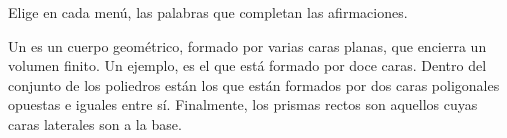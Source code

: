 \question Elige en cada menú, las palabras que completan las afirmaciones.
\begin{center}
     \quad {} \quad {} \quad
     \quad {} \quad {} \quad
     \quad {} \quad {} \quad
     \quad {} \quad {} \quad
\end{center}

Un \fillin[poliedro][2cm] es un cuerpo geométrico, formado por varias caras planas,
que encierra un volumen finito. Un ejemplo, es el \fillin[dodecaedro][3cm]
que está formado por doce caras. Dentro del conjunto de los poliedros están los \fillin[prismas][2cm]
que están formados por dos caras poligonales opuestas e iguales entre sí.
Finalmente, los prismas rectos son aquellos cuyas caras laterales son
\fillin[perpendiculares][3.5cm] a la base.